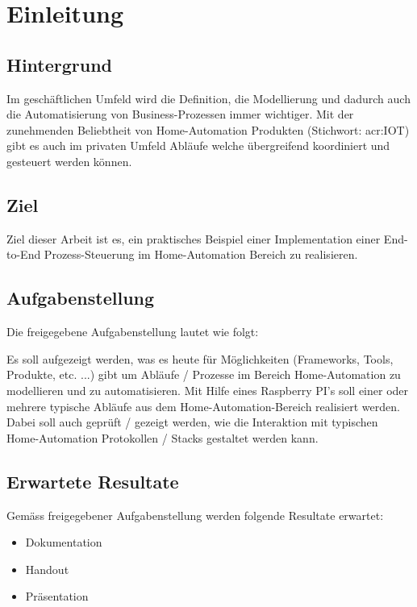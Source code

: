 
\chapter{Einleitung}

\section{Hintergrund}
Im geschäftlichen Umfeld wird die Definition, die Modellierung und dadurch auch die Automatisierung von Business-Prozessen immer wichtiger. Mit der zunehmenden Beliebtheit von Home-Automation Produkten (Stichwort: \gls{acr:IOT}) gibt es auch im privaten Umfeld Abläufe welche übergreifend koordiniert und gesteuert werden können.

\section{Ziel}
Ziel dieser Arbeit ist es, ein praktisches Beispiel einer Implementation einer
End-to-End Prozess-Steuerung im Home-Automation Bereich zu realisieren.

\section{Aufgabenstellung} \label{sec:Aufgabenstellung}
Die freigegebene Aufgabenstellung lautet wie folgt:

Es soll aufgezeigt werden, was es heute für Möglichkeiten (Frameworks, Tools,
Produkte, etc. ...) gibt um Abläufe / Prozesse im Bereich Home-Automation zu
modellieren und zu automatisieren. Mit Hilfe eines Raspberry PI's soll einer oder
mehrere typische Abläufe aus dem Home-Automation-Bereich realisiert werden.
Dabei soll auch geprüft / gezeigt werden, wie die Interaktion mit typischen
Home-Automation Protokollen / Stacks gestaltet werden kann.

\newpage
\section{Erwartete Resultate} \label{sec:ErwarteteResultate}
Gemäss freigegebener Aufgabenstellung werden folgende Resultate erwartet:

\begin{itemize}
\item Dokumentation
\item Handout
\item Präsentation
\end{itemize}


